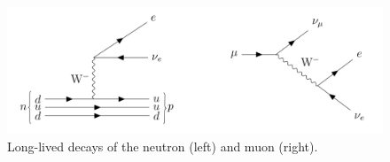 \begin{figure}[hbtp]
\centering
\includegraphics[scale=0.3]{figures/intro/neutron_muon_decays.pdf}
\caption{Long-lived decays of the neutron (left) and muon (right).}
\label{neutron_muon_decays}
\end{figure}